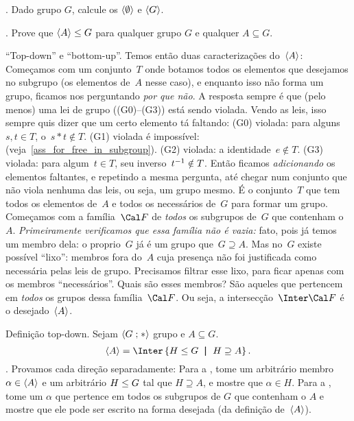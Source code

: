 \exercise.
Dado grupo $G$,
calcule os $\left\langle\emptyset\right\rangle$ e $\left\langle G\right\rangle$.

\endexercise

\exercise.
\label{justify_subgroup_on_subgroup_generate_A_direct}%
Prove que $\left\langle A\right\rangle \leq G$ para qualquer grupo $G$ e qualquer $A\subseteq G$.

\endexercise

\note ``Top-down'' e ``bottom-up''.
Temos então duas caracterizações do~$\left\langle A\right\rangle$:
\endgraf
{}
Começamos com um conjunto~$T$ onde botamos todos os elementos que desejamos
no subgrupo (os elementos de~$A$ nesse caso),
e enquanto isso não forma um grupo, ficamos nos perguntando \emph{por que não}.
A resposta sempre é que (pelo menos) uma lei de grupo ((G0)--(G3)) está sendo
violada.
Vendo as leis, isso sempre quis dizer que um certo elemento tá faltando:
\beginul
\li (G0) violada: para alguns~$s,t \in T$, o~$s\ast t \notin T$.
\li (G1) violada é impossível: (veja~\ref{ass_for_free_in_subgroup}).
\li (G2) violada: a identidade~$e \notin T$.
\li (G3) violada: para algum~$t \in T$, seu inverso~${t}^{-1} \notin T$.
\endul
\noindent
Então ficamos \emph{adicionando} os elementos faltantes, e repetindo a mesma
pergunta, até chegar num conjunto que não viola nenhuma das leis, ou seja, um
grupo mesmo.  É o conjunto~$T$ que tem todos os elementos de~$A$ e todos os
necessários de~$G$ para formar um grupo.
\endgraf
{}
Começamos com a família~$\cal F$ de \emph{todos} os subgrupos de~$G$
que contenham o~$A$.
\emph{Primeiramente verificamos que essa família não é vazia:}
fato, pois já temos um membro dela: o proprio~$G$ já é um grupo que~$G \supseteq A$.
Mas no~$G$ existe possível ``lixo'': membros fora do~$A$ cuja presença não
foi justificada como necessária pelas leis de grupo.
Precisamos filtrar esse lixo, para ficar apenas com os membros ``necessários''.
Quais são esses membros?  São aqueles que pertencem em \emph{todos} os grupos
dessa família~$\cal F$.  Ou seja, a intersecção~$\Inter \cal F$ é o
desejado~$\left\langle A\right\rangle$.

\proposition Definição top-down.
\label{subgroup_generate_A_topdown}%
Sejam $\langle{G}\mathrel{;}{\ast}\rangle$ grupo e $A \subseteq G$.
$$
\generate A = \Inter \setst { H \subgroup G } { H \supseteq A }.
$$
\sketch.
Provamos cada direção separadamente:
Para a \lrdirset, tome um arbitrário membro $\alpha \in \left\langle A\right\rangle$
e um arbitrário $H \leq G$ tal que $H \supseteq A$, e mostre
que $\alpha\in H$.
Para a \rldirset, tome um $\alpha$ que pertence em todos os subgrupos de $G$ que contenham o $A$
e mostre que ele pode ser escrito na forma desejada (da definição de~$\left\langle A\right\rangle$).
\qes

